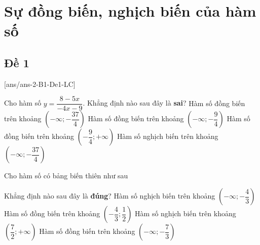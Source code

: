 \section{Sự đồng biến, nghịch biến của hàm số}
\subsection{Đề 1}
[ans/ans-2-B1-De1-LC]
\caulc
\begin{ex}%
	Cho hàm số $y=\dfrac{8-5x}{-4x-9}$. Khẳng định nào sau đây là \textbf{sai}?
	\choice
	{Hàm số đồng biến trên khoảng $\left(-\infty;-\dfrac{37}{4}\right)$}
	{Hàm số đồng biến trên khoảng $\left(-\infty;-\dfrac{9}{4}\right)$}
	{Hàm số đồng biến trên khoảng $\left(-\dfrac{9}{4};+\infty\right)$}
	{\True Hàm số nghịch biến trên khoảng $\left(-\infty;-\dfrac{37}{4}\right)$}
\end{ex}

\begin{ex}%
	Cho hàm số có bảng biến thiên như sau
	\begin{center}
	\end{center}
	Khẳng định nào sau đây là \textbf{đúng}?
	\choice
	{Hàm số nghịch biến trên khoảng $\left(-\infty;-\dfrac{4}{3}\right)$}
	{Hàm số đồng biến trên khoảng $\left(-\dfrac{4}{3};\dfrac{1}{2}\right)$}
	{Hàm số nghịch biến trên khoảng $\left(\dfrac{7}{2};+\infty\right)$}
	{\True Hàm số đồng biến trên khoảng $\left(-\infty;-\dfrac{7}{3}\right)$}
\end{ex}

